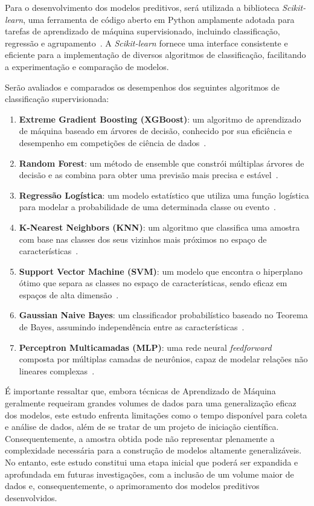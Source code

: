 \documentclass{article}
\begin{document}
Para o desenvolvimento dos modelos preditivos, será utilizada a biblioteca \textit{Scikit-learn}, uma ferramenta de código aberto em Python amplamente adotada para tarefas de aprendizado de máquina supervisionado, incluindo classificação, regressão e agrupamento~\cite{scikit-learn}. A \textit{Scikit-learn} fornece uma interface consistente e eficiente para a implementação de diversos algoritmos de classificação, facilitando a experimentação e comparação de modelos.

Serão avaliados e comparados os desempenhos dos seguintes algoritmos de classificação supervisionada:

\begin{enumerate}
    \item \textbf{Extreme Gradient Boosting (XGBoost)}: um algoritmo de aprendizado de máquina baseado em árvores de decisão, conhecido por sua eficiência e desempenho em competições de ciência de dados~\cite{chen2016xgboost}.
    \item \textbf{Random Forest}: um método de ensemble que constrói múltiplas árvores de decisão e as combina para obter uma previsão mais precisa e estável~\cite{breiman2001random}.
    \item \textbf{Regressão Logística}: um modelo estatístico que utiliza uma função logística para modelar a probabilidade de uma determinada classe ou evento~\cite{hosmer2013applied}.
    \item \textbf{K-Nearest Neighbors (KNN)}: um algoritmo que classifica uma amostra com base nas classes dos seus vizinhos mais próximos no espaço de características~\cite{cover1967nearest}.
    \item \textbf{Support Vector Machine (SVM)}: um modelo que encontra o hiperplano ótimo que separa as classes no espaço de características, sendo eficaz em espaços de alta dimensão~\cite{cortes1995support}.
    \item \textbf{Gaussian Naive Bayes}: um classificador probabilístico baseado no Teorema de Bayes, assumindo independência entre as características~\cite{rish2001empirical}.
    \item \textbf{Perceptron Multicamadas (MLP)}: uma rede neural \textit{feedforward} composta por múltiplas camadas de neurônios, capaz de modelar relações não lineares complexas~\cite{rumelhart1986learning}.
\end{enumerate}

É importante ressaltar que, embora técnicas de Aprendizado de Máquina geralmente requeiram grandes volumes de dados para uma generalização eficaz dos modelos, este estudo enfrenta limitações como o tempo disponível para coleta e análise de dados, além de se tratar de um projeto de iniciação científica. Consequentemente, a amostra obtida pode não representar plenamente a complexidade necessária para a construção de modelos altamente generalizáveis. No entanto, este estudo constitui uma etapa inicial que poderá ser expandida e aprofundada em futuras investigações, com a inclusão de um volume maior de dados e, consequentemente, o aprimoramento dos modelos preditivos desenvolvidos.
\end{document}
